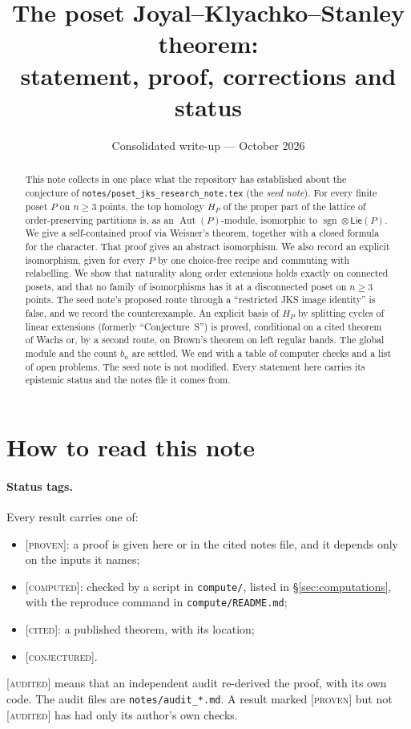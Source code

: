 \documentclass[11pt]{article}
\title{The poset Joyal--Klyachko--Stanley theorem:\\
statement, proof, corrections and status}
\author{}
\date{Consolidated write-up --- October 2026}
\theoremstyle{definition}
\theoremstyle{remark}
\newcommand{\Aut}{\operatorname{Aut}}
\newcommand{\sgn}{\operatorname{sgn}}
\newcommand{\PLie}{\mathsf{Lie}}
\newcommand{\st}[1]{\textup{[\textsc{#1}]}}
\newcommand{\src}[1]{\nolinkurl{#1}}
\begin{document}
\maketitle

\begin{abstract}
This note collects in one place what the repository has established about
the conjecture of \src{notes/poset_jks_research_note.tex} (the \emph{seed
note}). For every finite poset $P$ on $n\ge3$ points, the top homology $H_P$
of the proper part of the lattice of order-preserving partitions is, as an
$\Aut(P)$-module, isomorphic to $\sgn\otimes\PLie(P)$. We give a
self-contained proof via Weisner's theorem, together with a closed formula
for the character. That proof gives an abstract isomorphism. We also record
an explicit isomorphism, given for every $P$ by one choice-free recipe and
commuting with relabelling. We show that naturality along order extensions
holds exactly on connected posets, and that no family of isomorphisms has
it at a disconnected poset on $n\ge3$ points. The seed note's
proposed route through a ``restricted JKS image identity'' is false, and we
record the counterexample. An explicit basis of $H_P$ by splitting cycles of
linear extensions (formerly ``Conjecture~S'') is proved, conditional on a
cited theorem of Wachs or, by a second route, on Brown's theorem on left
regular bands. The global module and the count $b_n$ are settled. We
end with a table of computer checks and a list of open problems. The seed
note is not modified. Every statement here carries its epistemic status and
the notes file it comes from.
\end{abstract}

\tableofcontents

\section{How to read this note}

\paragraph{Status tags.} Every result carries one of:
\begin{itemize}[nosep]
\item \st{proven}: a proof is given here or in the cited notes file, and it
  depends only on the inputs it names;
\item \st{computed}: checked by a script in \src{compute/}, listed in
  \S\ref{sec:computations}, with the reproduce command in \src{compute/README.md};
\item \st{cited}: a published theorem, with its location;
\item \st{conjectured}.
\end{itemize}
\st{audited} means that an independent audit re-derived the proof, with its
own code. The audit files are \src{notes/audit_*.md}. A result marked
\st{proven} but not \st{audited} has had only its author's own checks.
\end{document}
